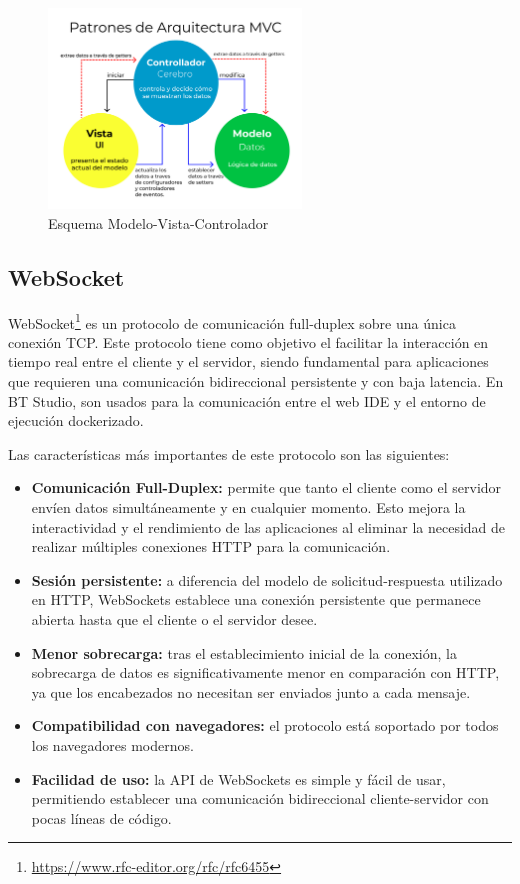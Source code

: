 \begin{figure}[htp]
    \centering
    \includegraphics[width=0.6\textwidth]{figures/mvc.png}
    \caption{Esquema Modelo-Vista-Controlador}
    \label{fig:ejemplo}
\end{figure}

\subsection{WebSocket}

WebSocket\footnote{\url{https://www.rfc-editor.org/rfc/rfc6455}} es un protocolo de comunicación full-duplex sobre una única conexión TCP. Este protocolo tiene como objetivo el facilitar la interacción en tiempo real entre el cliente y el servidor, siendo fundamental para aplicaciones que requieren una comunicación bidireccional persistente y con baja latencia. En BT Studio, son usados para la comunicación entre el web IDE y el entorno de ejecución dockerizado. 

Las características más importantes de este protocolo son las siguientes:

\begin{itemize}
    \item \textbf{Comunicación Full-Duplex:} permite que tanto el cliente como el servidor envíen datos simultáneamente y en cualquier momento. Esto mejora la interactividad y el rendimiento de las aplicaciones al eliminar la necesidad de realizar múltiples conexiones HTTP para la comunicación.
    
    \item \textbf{Sesión persistente:} a diferencia del modelo de solicitud-respuesta utilizado en HTTP, WebSockets establece una conexión persistente que permanece abierta hasta que el cliente o el servidor desee.
    
    \item \textbf{Menor sobrecarga:} tras el establecimiento inicial de la conexión, la sobrecarga de datos es significativamente menor en comparación con HTTP, ya que los encabezados no necesitan ser enviados junto a cada mensaje.
    
    \item \textbf{Compatibilidad con navegadores:} el protocolo está soportado por todos los navegadores modernos.
    
    \item \textbf{Facilidad de uso:} la API de WebSockets es simple y fácil de usar, permitiendo establecer una comunicación bidireccional cliente-servidor con pocas líneas de código.
\end{itemize}

